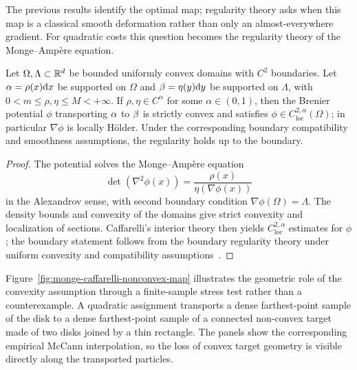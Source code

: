 The previous results identify the optimal map; regularity theory asks when this map is a classical smooth deformation rather than only an almost-everywhere gradient. For quadratic costs this question becomes the regularity theory of the Monge--Amp\`ere equation.

\begin{prop}\label{prop-caffarelli-regularity}
	Let $\Omega,\Lambda\subset\mathbb{R}^d$ be bounded uniformly convex domains with $C^2$ boundaries. Let $\alpha=\rho(x)\mathrm{d} x$ be supported on $\Omega$ and $\beta=\eta(y)\mathrm{d} y$ be supported on $\Lambda$, with $0<m\leq\rho,\eta\leq M<+\infty$. If $\rho,\eta\in C^\alpha$ for some $\alpha\in(0,1)$, then the Brenier potential $\phi$ transporting $\alpha$ to $\beta$ is strictly convex and satisfies $\phi\in C^{2,\alpha}_{\mathrm{loc}}(\Omega)$; in particular $\nabla\phi$ is locally H\"older. Under the corresponding boundary compatibility and smoothness assumptions, the regularity holds up to the boundary.
\end{prop}
\begin{proof}
	The potential solves the Monge--Amp\`ere equation
	\[
		\det(\nabla^2\phi(x))
		=
		\frac{\rho(x)}{\eta(\nabla\phi(x))}
	\]
	in the Alexandrov sense, with second boundary condition $\nabla\phi(\Omega)=\Lambda$. The density bounds and convexity of the domains give strict convexity and localization of sections. Caffarelli's interior theory then yields $C^{2,\alpha}_{\mathrm{loc}}$ estimates for $\phi$; the boundary statement follows from the boundary regularity theory under uniform convexity and compatibility assumptions~\cite{caffarelli2003monge,Villani09}.
\end{proof}

Figure~\ref{fig:monge-caffarelli-nonconvex-map} illustrates the geometric role of the convexity assumption through a finite-sample stress test rather than a counterexample. A quadratic assignment transports a dense farthest-point sample of the disk to a dense farthest-point sample of a connected non-convex target made of two disks joined by a thin rectangle. The panels show the corresponding empirical McCann interpolation, so the loss of convex target geometry is visible directly along the transported particles.


